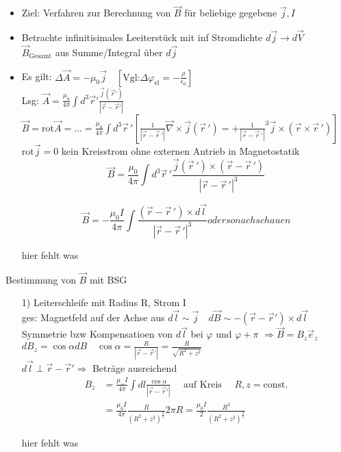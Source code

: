 \documentclass[titlepage,12pt,a4paper,ngerman]{report}
\newcommand{\tx}[1]{\textrm{#1}}
\begin{document}
\begin{itemize}
	\item Ziel: Verfahren zur Berechnung von $ \vec{B} $ für beliebige gegebene $ \vec{j}, I $
	\item  Betrachte infinitisimales Leeiterstück mit inf Stromdichte $ d\vec{j} \rightarrow d \vec{V} $ \\
	$ \vec{B}_{\tx{Gesamt}} $ aus Summe/Integral über $ d\vec{j} $
	\item Es gilt: $ \Delta \vec{A} = -\mu_0 \vec{j} \quad [\tx{Vgl:} \Delta \varphi_{\tx{el}} = - \frac{\rho}{\epsilon_0}] $ \\
	Lsg: $  \vec{A} = \frac{ \mu_0}{4 \pi} \int d^3 \vec{r}' \frac{\vec{j} (\vec{r}')}{|\vec{r} - \vec{r}'|} $\\
	$ \vec{B}  = \tx{rot} \vec{A} = \dots = \frac{\mu_0}{4 \pi} \int d^3 \vec{r}\,' [ \frac{1}{|\vec{r} - \vec{r}\,'|} \vec{\nabla} \times \vec{j} (\vec{r}\,')= + \frac{1}{|\vec{r} - \vec{r}\,'|}^3 \vec{j} \times (\vec{r} \times \vec{r}\,')] $\\
	$ \tx{rot} \vec{j} = 0 $ kein Kreisstrom ohne externen Antrieb in Magnetostatik
	$$\boxed{\vec{B} = \frac{\mu_0}{4\pi} \int d^3 \vec{r}\,' \frac{\vec{j} (\vec{r}\,') \times (\vec{r} - \vec{r}\,') }{| \vec{r} - \vec{r}\,'| ^3}}$$
	
	$$\boxed{\vec{B} = -\frac{\mu_0 I}{4\pi} \int \frac{(\vec{r} - \vec{r}\,') \times d\vec{l} }{| \vec{r} - \vec{r}\,'| ^3}} oder so nachschauen $$
	
	hier fehlt was\\
	
\end{itemize}
Bestimmung von $ \vec{B} $ mit BSG
\begin{itemize}
	\item[1)] Leiterschleife mit Radius R, Strom I\\
	ges: Magnetfeld auf der Achse aus $ d\vec{l} \sim \vec{j} \quad d \vec{B} \sim - (\vec{r} - \vec{r}') \times d\vec{l} $\\
	Symmetrie bzw Kompensatioen von $ d\vec{l} $ bei $ \varphi $ und $\varphi + \pi$ $ \Rightarrow \vec{B} = B_z \vec{e}_z $\\
	$ dB_z = \cos \alpha d B \quad \cos \alpha = \frac{R}{|\vec{r} - \vec{r} '| }  = \frac{R}{\sqrt{R^2 + z^2}}$\\
	$ d\vec{l} \perp \vec{r} - \vec{r}' \Rightarrow $ Beträge ausreichend\\
	\begin{align*}
	B_z & = \frac{\mu_= I }{4 \pi} \int d l \frac{\cos \alpha }{|\vec{r} - \vec{r}'|} \quad \tx{ auf Kreis } \quad R,z = \tx{const.} \\
	& = \frac{\mu_0 I }{4 \pi} \frac{R}{(R^2 + z^2 )^{\frac{3}{2}}} 2 \pi R = \frac{\mu_0 I }{2} \frac{ R^2}{(R^2 + z^2 ) ^{\frac{3}{2}}}
	\end{align*}
	
	hier fehlt was 
	
\end{itemize}
\end{document}
